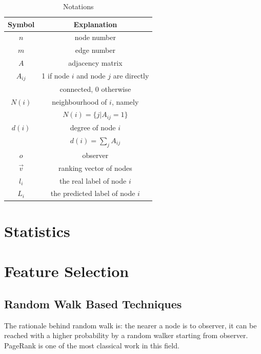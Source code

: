 \documentclass[11pt,a4paper]{article}
\begin{document}
\begin{table}[htb]
	\centering
	\caption{Notations}
	\label{tbl:notation}
	\begin{tabular}{c|c}
	\hline
	Symbol & Explanation \\
	\hline
	$n$ & node number \\
	$m$ & edge number \\
	$A$ & adjacency matrix \\
	$A_{ij}$ & 1 if node $i$ and node $j$ are directly \\
	& connected, 0 otherwise\\
	$N(i)$ & neighbourhood of $i$, namely \\
	& $N(i) = \{j | A_{ij} = 1 \}$ \\
	$d(i)$ & degree of node $i$ \\
	& $d(i) = \sum_{j}{A_{ij}}$ \\
	$o$ & observer \\
	$\overrightarrow{v}$ & ranking vector of nodes \\
	$l_i$ & the real label of node $i$ \\
	$L_i$ & the predicted label of node $i$ \\
	\hline
	\end{tabular}
\end{table}

\section{Statistics}



\section{Feature Selection}

\subsection{Random Walk Based Techniques}
\label{sec:prox_pr}

The rationale behind random walk is: the nearer a node
is to observer, it can be reached with a higher probability by a random 
	walker starting from observer. PageRank is one of the most classical work 
	in this field.
\end{document}
